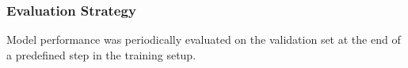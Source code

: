 \documentclass[logo,msc]{infthesis}           %
\begin{document}
\subsubsection*{Evaluation Strategy}
Model performance was periodically evaluated on the validation set at the end of a predefined step in the training setup.

\end{document}
